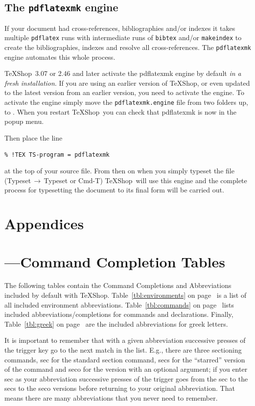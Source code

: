 \documentclass[letterpaper,11pt]{article}
\newcommand{\TS}{\textsf{\TeX Shop}}
\newcommand{\cmd}[1]{\textsf{#1}}
\newcommand{\mnu}[1]{\textsf{#1}}
\newcommand{\To}{\,\(\to\)\,}
\begin{document}
\subsection{The \texttt{pdflatexmk} engine}

If your document had cross-references, bibliographies and/or indexes it takes multiple \texttt{pdflatex} runs with intermediate runs of \texttt{bibtex} and/or \texttt{makeindex} to create the bibliographies, indexes and resolve all cross-references. The \texttt{pdflatexmk} engine automates this whole process.

\TS\ 3.07 or 2.46 and later activate the pdflatexmk engine by default \emph{in a fresh installation}. If you are using an earlier version of \TS, or even updated to the latest version from an earlier version, you need to activate the engine. To activate the engine simply move the \texttt{pdflatexmk.engine} file from  two folders up, to . When you restart \TS\ you can check that \cmd{pdflatexmk} is now in the popup menu.

Then place the line
\begin{verbatim}
% !TEX TS-program = pdflatexmk
\end{verbatim}
at the top of your source file. From then on when you simply typeset the file (\mnu{Typeset}\To\mnu{Typeset} or \cmd{Cmd-T}) \TS\ will use this engine and the complete process for typesetting the document to its final form will be carried out.

\section*{Appendices}
\appendix

\section{---\quad Command Completion Tables}\label{sec:CCTables}
The following tables contain the Command Completions and Abbreviations included by default with \TS. Table~\ref{tbl:environments} on page~\pageref{tbl:environments} is a list of all included environment abbreviations. Table~\ref{tbl:commands} on page~\pageref{tbl:commands} lists included abbreviations/completions for commands and declarations. Finally, Table~\ref{tbl:greek} on page~\pageref{tbl:greek} are the included abbreviations for greek letters.

It is important to remember that with a given abbreviation successive presses of the trigger key go to the next match in the list. E.g., there are three sectioning commands, \cmd{sec} for the standard section command, \cmd{secs} for the ``starred'' version of the command and \cmd{seco} for the version with an optional argument; if you enter \cmd{sec} as your abbreviation successive presses of the trigger goes from the \cmd{sec} to the \cmd{secs} to the \cmd{seco} versions before returning to your original abbreviation. That means there are many abbreviations that you never need to remember.
\end{document}
